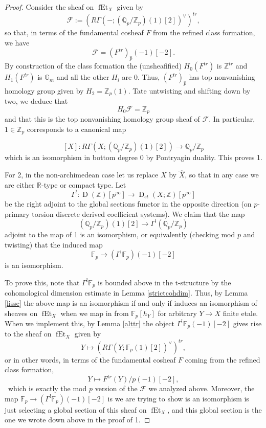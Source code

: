 \documentclass[10pt,a4paper]{amsart}
\newcommand{\mbb}{\mathbb}
\newcommand{\mc}{\mathcal}
\newcommand{\on}{\operatorname}
\newcommand{\wh}{\widehat}
\begin{document}
\begin{proof}
Consider the sheaf on $\on{fEt}_X$ given by
$$\mathcal{F}:= \left(R\Gamma(-;(\mbb{Q}_p/\mbb{Z}_p)(1)[2])^\vee\right)^{tr},$$
so that, in terms of the fundamental cosheaf $F$ from the refined class formation, we have
$$\mc{F} = (F^{tr})_{\wh{p}}(-1)[-2].$$
By construction of the class formation the (unsheafified) $H_0(F^{tr})$ is $\mbb{Z}^{tr}$ and $H_1(F^{tr})$ is $\mbb{G}_m$ and all the other $H_i$ are $0$.  Thus, $(F^{tr})_{\wh{p}}$ has top nonvanishing homology group given by $H_2 = \mbb{Z}_p(1)$.  Tate untwisting and shifting down by two, we deduce that
$$H_0\mc{F} = \mbb{Z}_p$$
and that this is the top nonvanishing homology group sheaf of $\mc{F}$.  In particular, $1\in\mbb{Z}_p$ corresponds to a canonical map

$$[X]: R\Gamma(X;(\mbb{Q}_p/\mbb{Z}_p)(1)[2])\to\mbb{Q}_p/\mbb{Z}_p$$
which is an isomorphism in bottom degree $0$ by Pontryagin duality.  This proves 1.

For 2, in the non-archimedean case let us replace $X$ by $\wh{X}$, so that in any case we are either $\mbb{R}$-type or compact type. Let
$$\Gamma^!:\on{D}(\mbb{Z})[p^\infty] \to \on{D}_{et}(X;\mbb{Z})[p^\infty]$$
be the right adjoint to the global sections functor in the opposite direction (on $p$-primary torsion discrete derived coefficient systems).  We claim that the map
$$(\mbb{Q}_p/\mbb{Z}_p)(1)[2] \to \Gamma^!(\mbb{Q}_p/\mbb{Z}_p)$$
adjoint to the map of 1 is an isomorphism, or equivalently (checking mod $p$ and twisting) that the induced map
$$\mbb{F}_p \to (\Gamma^!\mbb{F}_p)(-1)[-2]$$
is an isomorphism.

To prove this, note that $\Gamma^!\mbb{F}_p$ is bounded above in the t-structure by the cohomological dimension estimate in Lemma \ref{strictcohdim}.  Thus, by Lemma \ref{lisse} the above map is an isomorphism if and only if induces an isomorphism of sheaves on $\on{fEt}_X$ when we map in from $\mbb{F}_p[h_Y]$ for arbitrary $Y\to X$ finite etale.  When we implement this, by Lemma \ref{alttr} the object $\Gamma^!\mbb{F}_p(-1)[-2]$ gives rise to the sheaf on $\on{fEt}_X$ given by
$$Y\mapsto (R\Gamma(Y;\mbb{F}_p(1)[2])^\vee)^{tr},$$
or in other words, in terms of the fundamental cosheaf $F$ coming from the refined class formation,
$$Y\mapsto F^{tr}(Y)/p(-1)[-2],$$\
which is exactly the mod $p$ version of the $\mc{F}$ we analyzed above.  Moreover, the map $\mbb{F}_p\to (\Gamma^!\mbb{F}_p)(-1)[-2]$ is we are trying to show is an isomorphism is just selecting a global section of this sheaf on $\on{fEt}_X$, and this global section is the one we wrote down above in the proof of 1.


\end{proof}
\end{document}
